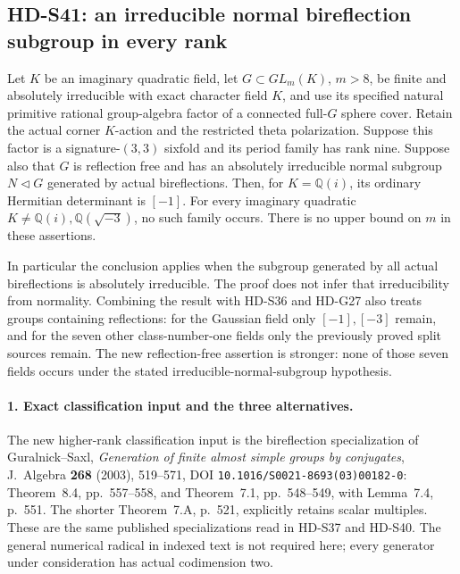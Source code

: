 \subsection{HD-S41: an irreducible normal bireflection subgroup in every rank}
\label{sec:irreducible-bireflection-all-ranks}

Let \(K\) be an imaginary quadratic field, let
\(G\subset GL_m(K)\), \(m>8\), be finite and absolutely
irreducible with exact character field \(K\), and use its
specified natural primitive rational group-algebra factor of a
connected full-\(G\) sphere cover. Retain the actual corner
\(K\)-action and the restricted theta polarization. Suppose
this factor is a signature-\((3,3)\) sixfold and its period
family has rank nine. Suppose also that \(G\) is reflection
free and has an absolutely irreducible normal subgroup
\(N\triangleleft G\) generated by actual bireflections.
Then, for \(K=\mathbb Q(i)\), its ordinary Hermitian
determinant is \([-1]\). For every imaginary quadratic
\(K\ne\mathbb Q(i),\mathbb Q(\sqrt{-3})\), no such
family occurs. There is no upper bound on \(m\) in these
assertions.

In particular the conclusion applies when the subgroup generated
by all actual bireflections is absolutely irreducible. The proof
does not infer that irreducibility from normality. Combining the
result with HD-S36 and HD-G27 also treats groups containing
reflections: for the Gaussian field only \([-1],[-3]\)
remain, and for the seven other class-number-one fields only the
previously proved split sources remain. The new reflection-free
assertion is stronger: none of those seven fields occurs under
the stated irreducible-normal-subgroup hypothesis.

\paragraph{1. Exact classification input and the three alternatives.}
The new higher-rank classification input is the bireflection specialization
of Guralnick--Saxl, \emph{Generation of finite almost simple
groups by conjugates}, J.~Algebra \textbf{268} (2003),
519--571, DOI \texttt{10.1016/S0021-8693(03)00182-0}:
Theorem~8.4, pp.~557--558, and Theorem~7.1,
pp.~548--549, with Lemma~7.4, p.~551.
The shorter Theorem~7.A, p.~521, explicitly retains scalar
multiples. These are the same published specializations read in
HD-S37 and HD-S40. The general numerical radical in indexed
text is not required here; every generator under consideration
has actual codimension two.

